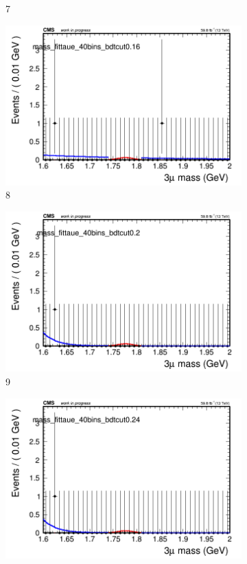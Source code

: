 \begin{figure}[h!]
\begin{subfigure}{0.2\textwidth}
        \caption{7}
    \end{subfigure}
    \begin{subfigure}{0.2\textwidth}
        \includegraphics[width=\textwidth]{power_law/plots/taue/massfit_taue_40bins_bdtcut0.16.png}
        \caption{8}
    \end{subfigure}
    \begin{subfigure}{0.2\textwidth}
        \includegraphics[width=\textwidth]{power_law/plots/taue/massfit_taue_40bins_bdtcut0.2.png}
        \caption{9}
    \end{subfigure}
    \begin{subfigure}{0.2\textwidth}
        \includegraphics[width=\textwidth]{power_law/plots/taue/massfit_taue_40bins_bdtcut0.24.png}

\end{subfigure}
\end{figure}
